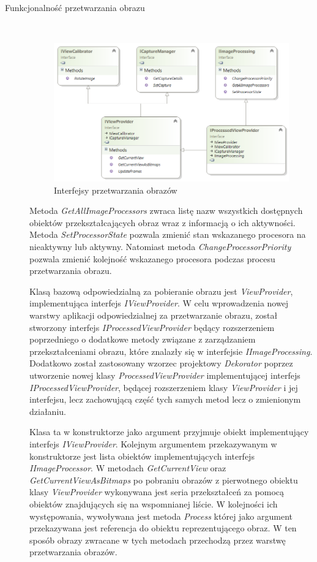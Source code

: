 \documentclass[a4paper,11pt,twoside]{report}
\theoremstyle{definition}
\begin{document}
\begin{description}

\item [Funkcjonalność przetwarzania obrazu] \hfill \\
\begin{figure}[h]
\centering
\includegraphics[scale=0.9]{images/IProcessedViewProvider}
\caption[Przetwarzanie diagram]{Interfejsy przetwarzania obrazów}
\end{figure}

Metoda \textit{GetAllImageProcessors} zwraca listę nazw wszystkich dostępnych obiektów przekształcających obraz wraz z informacją o ich aktywności.
Metoda \textit{SetProcessorState} pozwala zmienić stan wskazanego procesora na nieaktywny lub aktywny.
Natomiast metoda \textit{ChangeProcessorPriority} pozwala zmienić kolejność wskazanego procesora podczas procesu przetwarzania obrazu. 

Klasą bazową odpowiedzialną za pobieranie obrazu jest \textit{ViewProvider}, implementująca interfejs \textit{IViewProvider}. W celu wprowadzenia nowej warstwy aplikacji odpowiedzialnej za przetwarzanie obrazu, został stworzony interfejs \textit{IProcessedViewProvider} będący rozszerzeniem poprzedniego o dodatkowe metody związane z zarządzaniem przekształceniami obrazu, które znalazły się w interfejsie \textit{IImageProcessing}. Dodatkowo został zastosowany wzorzec projektowy \textit{Dekorator} poprzez utworzenie nowej klasy \textit{ProcessedViewProvider} implementującej interfejs \textit{IProcessedViewProvider}, będącej rozszerzeniem klasy \textit{ViewProvider} i jej interfejsu, lecz zachowującą część tych samych metod lecz o zmienionym działaniu.

Klasa ta w konstruktorze jako argument przyjmuje obiekt implementujący interfejs \textit{IViewProvider}. Kolejnym argumentem przekazywanym w konstruktorze jest lista obiektów implementujących interfejs \textit{IImageProcessor}. W metodach \textit{GetCurrentView} oraz \textit{GetCurrentViewAsBitmaps} po pobraniu obrazów z pierwotnego obiektu klasy \textit{ViewProvider} wykonywana jest seria przekształceń za pomocą obiektów znajdujących się na wspomnianej liście. W kolejności ich występowania, wywoływana jest metoda \textit{Process} której jako argument przekazywana jest referencja do obiektu reprezentującego obraz. W ten sposób obrazy zwracane w tych metodach przechodzą przez warstwę przetwarzania obrazów.


\end{description}
\end{document}

